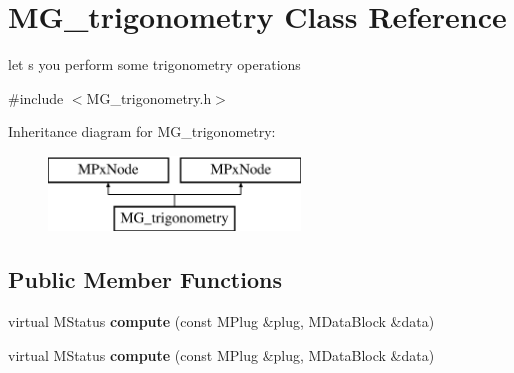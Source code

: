 \hypertarget{class_m_g__trigonometry}{\section{M\-G\-\_\-trigonometry Class Reference}
\label{class_m_g__trigonometry}
}


let s you perform some trigonometry operations  




{\ttfamily \#include $<$M\-G\-\_\-trigonometry.\-h$>$}

Inheritance diagram for M\-G\-\_\-trigonometry\-:\begin{figure}[H]
\begin{center}
\leavevmode
\includegraphics[height=2.000000cm]{class_m_g__trigonometry}
\end{center}
\end{figure}
\subsection*{Public Member Functions}
\begin{DoxyCompactItemize}
\item 
\hypertarget{class_m_g__trigonometry_aced7068cd45cd709efa05a906f21c7ee}{virtual M\-Status {\bfseries compute} (const M\-Plug \&plug, M\-Data\-Block \&data)}\label{class_m_g__trigonometry_aced7068cd45cd709efa05a906f21c7ee}

\item 
\hypertarget{class_m_g__trigonometry_aced7068cd45cd709efa05a906f21c7ee}{virtual M\-Status {\bfseries compute} (const M\-Plug \&plug, M\-Data\-Block \&data)}\label{class_m_g__trigonometry_aced7068cd45cd709efa05a906f21c7ee}

\end{DoxyCompactItemize}
